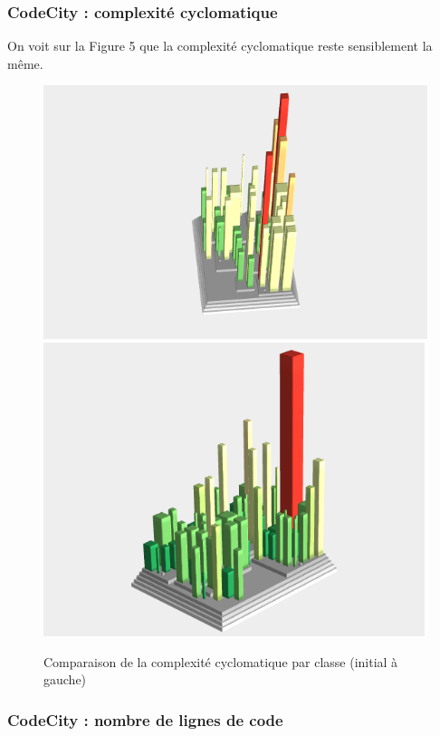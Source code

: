 \documentclass[a4paper,12pt]{report} %
\begin{document}
\subsubsection{CodeCity : complexité cyclomatique}

On voit sur la Figure 5 que la complexité cyclomatique reste sensiblement
la même.

\begin{figure}[!h]
\includegraphics[scale=0.5]{ressources/final_initial_cyclomatic}\includegraphics[scale=0.5]{ressources/final_new_cyclomatic}\caption{Comparaison de la complexité cyclomatique par classe (initial à gauche)}


\end{figure}



\subsubsection{CodeCity : nombre de lignes de code}
\end{document}
